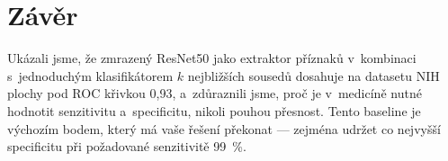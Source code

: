 \documentclass[11pt]{article}
\newcommand{\knnAUC}{0{,}93}
\begin{document}
\section{Závěr}
\label{sec:zaver}

Ukázali jsme, že zmrazený ResNet50 jako extraktor příznaků v~kombinaci s~jednoduchým
klasifikátorem $k$ nejbližších sousedů dosahuje na datasetu NIH plochy pod ROC křivkou
\knnAUC{}, a~zdůraznili jsme, proč je v~medicíně nutné hodnotit senzitivitu a~specificitu,
nikoli pouhou přesnost. Tento baseline je výchozím bodem, který má vaše řešení překonat ---
zejména udržet co nejvyšší specificitu při požadované senzitivitě 99~\%.


\end{document}
